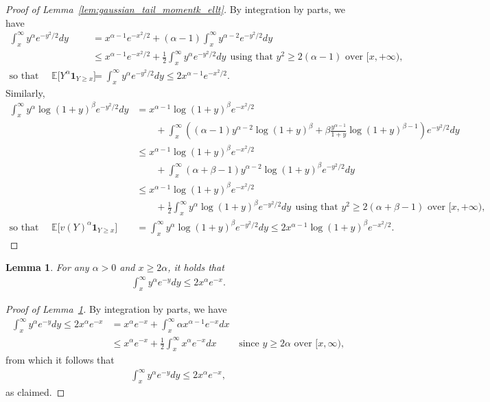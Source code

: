 \documentclass{article}
\newcommand{\one}{\mathbf{1}}
\newtheorem{lemma}{Lemma}
\begin{document}
\begin{proof}[Proof of Lemma~\ref{lem:gaussian_tail_momentk_ellt}]
By integration by parts, we have 
\begin{align*}
    \int_x^\infty y^\alpha e^{-y^2/2} dy &= x^{\alpha-1} e^{-x^2/2} + (\alpha\!-\!1)\! \int_x^{\infty} \! y^{\alpha-2} e^{-y^2/2} dy\\
    &\leq x^{\alpha-1} e^{-x^2/2} + \frac{1}{2} \int_x^\infty y^\alpha e^{-y^2/2} dy ~~ \text{using that $y^2 \geq 2(\alpha-1)$ over $[x,+\infty)$},\\
    \text{so that } \quad 
        \mathbb E \big[ Y^\alpha \one_{Y\geq x}\big] &= \int_x^\infty y^\alpha e^{-y^2/2} dy \leq 2x^{\alpha-1} e^{-x^2/2}.
\end{align*}
Similarly,
\begin{align*}
    \int_x^\infty y^\alpha\log(1+y)^\beta e^{-y^2/2} dy &= x^{\alpha-1}\log(1+y)^\beta e^{-x^2/2} \\
    & \qquad + \! \int_x^{\infty} \! \left((\alpha\!-\!1)y^{\alpha-2} \log(1+y)^\beta + \beta \frac{y^{\alpha-1} }{1+y}\log(1+y)^{\beta-1} \right) e^{-y^2/2} dy\\
    & \leq x^{\alpha-1}\log(1+y)^\beta e^{-x^2/2} \\
    & \qquad + \! \int_x^{\infty} \! (\alpha + \beta - 1)y^{\alpha-2} \log(1+y)^\beta e^{-y^2/2} dy\\
    &\leq x^{\alpha-1}\log(1+y)^\beta e^{-x^2/2} \\
    & \qquad + \frac{1}{2} \int_x^\infty y^\alpha \log(1+y)^\beta e^{-y^2/2} dy ~~ \text{using that $y^2 \geq 2(\alpha+\beta-1)$ over $[x,+\infty)$},\\
    \text{so that } \quad 
        \mathbb E \big[ v(Y)^\alpha \one_{Y\geq x}\big] &= \int_x^\infty y^\alpha \log(1+y)^\beta e^{-y^2/2} dy \leq 2x^{\alpha-1}\log(1+y)^\beta e^{-x^2/2}.
\end{align*}
\end{proof}

\begin{lemma}\label{lem_moment_exponential}
    For any $\alpha>0$ and $x \geq 2\alpha$, it holds that
    \begin{align*}
        \int_{x}^\infty y^\alpha e^{-y} dy \leq 2 x^\alpha e^{-x}.
    \end{align*}
\end{lemma}
\begin{proof}[Proof of Lemma~\ref{lem_moment_exponential}]
    By integration by parts, we have
    \begin{align*}
        \int_{x}^\infty y^\alpha e^{-y} dy \leq 2 x^\alpha e^{-x} &= x^\alpha e^{-x} + \int_{x}^\infty \alpha x^{\alpha-1} e^{-x} dx\\
        & \leq x^\alpha e^{-x} + \frac{1}{2}\int_{x}^\infty  x^{\alpha} e^{-x} dx \qquad \text{ since } y \geq 2\alpha \text{ over } [x,\infty),
    \end{align*}
    from which it follows that
    \begin{align*}
        \int_{x}^\infty y^\alpha e^{-y} dy \leq 2 x^\alpha e^{-x},
    \end{align*}
    as claimed.
\end{proof}
\end{document}
